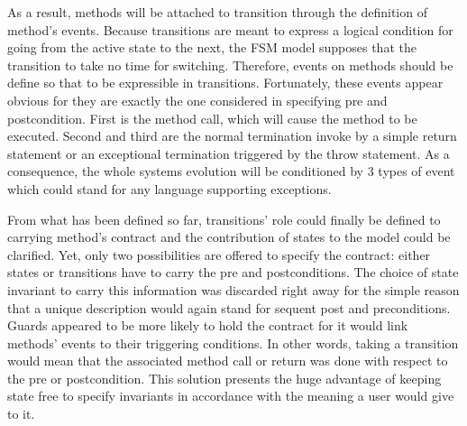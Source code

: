As a result, methods will be attached to transition through the definition of method's events. Because transitions are meant to express a logical condition for going from the active state to the next, the FSM model supposes that the transition to take no time for switching. Therefore, events on methods should be define so that to be expressible in transitions. Fortunately, these events appear obvious for they are exactly the one considered in specifying pre and postcondition. First is the method call, which will cause the method to be executed. Second and third are the normal termination invoke by a simple return statement or an exceptional termination triggered by the throw statement. As a consequence, the whole systems evolution will be conditioned by 3 types of event which could stand for any language supporting exceptions.

From what has been defined so far, transitions' role could finally be defined to carrying method's contract and the contribution of states to the model could be clarified. Yet, only two possibilities are offered to specify the contract: either states or transitions have to carry the pre and postconditions. The choice of state invariant to carry this information was discarded right away for the simple reason that a unique description would again stand for sequent post and preconditions. Guards appeared to be more likely to hold the contract for it would link methods' events to their triggering conditions. In other words, taking a transition would mean that the associated method call or return was done with respect to the pre or postcondition. This solution presents the huge advantage of keeping state free to specify invariants in accordance with the meaning a user would give to it. 


